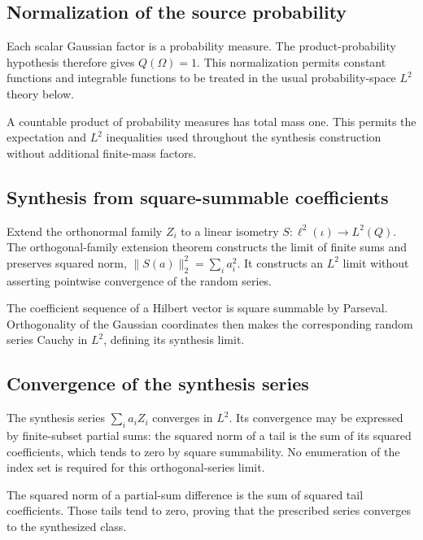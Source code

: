 \documentclass[11pt,a4paper]{article}
\begin{document}
\subsection{\texorpdfstring{Normalization of the source probability}{Normalization of the source probability}}


Each scalar Gaussian factor is a probability measure. The product-probability hypothesis therefore gives \(Q(\Omega)=1\). This normalization permits constant functions and integrable functions to be treated in the usual probability-space \(L^2\) theory below.



A countable product of probability measures has total mass one. This permits the expectation and \(L^2\) inequalities used throughout the synthesis construction without additional finite-mass factors.


\subsection{\texorpdfstring{Synthesis from square-summable coefficients}{Synthesis from square-summable coefficients}}


Extend the orthonormal family \(Z_i\) to a linear isometry \(S:\ell^2(\iota)\to L^2(Q)\). The orthogonal-family extension theorem constructs the limit of finite sums and preserves squared norm, \(\|S(a)\|_2^2=\sum_i a_i^2\). It constructs an \(L^2\) limit without asserting pointwise convergence of the random series.



The coefficient sequence of a Hilbert vector is square summable by Parseval. Orthogonality of the Gaussian coordinates then makes the corresponding random series Cauchy in \(L^2\), defining its synthesis limit.


\subsection{\texorpdfstring{Convergence of the synthesis series}{Convergence of the synthesis series}}


The synthesis series \(\sum_i a_iZ_i\) converges in \(L^2\). Its convergence may be expressed by finite-subset partial sums: the squared norm of a tail is the sum of its squared coefficients, which tends to zero by square summability. No enumeration of the index set is required for this orthogonal-series limit.



The squared norm of a partial-sum difference is the sum of squared tail coefficients. Those tails tend to zero, proving that the prescribed series converges to the synthesized class.
\end{document}
